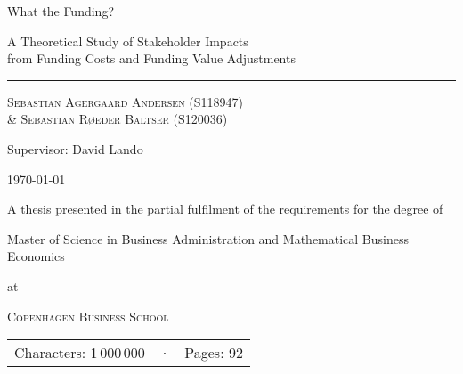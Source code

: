 \documentclass[main.tex]{subfiles}
\begin{document}
	\begin{titlepage}
		\centering
		\vspace{5cm}
		{\Huge What the Funding? \par}
		{\Large A Theoretical Study of Stakeholder Impacts \\ 
		from Funding Costs and Funding Value Adjustments \par}
		\rule{\textwidth}{1px}\par
		{\scshape\large 
			Sebastian Agergaard Andersen {\scriptsize(S118947)} \\
			\& Sebastian Røeder Baltser {\scriptsize(S120036)}
		\par}
		Supervisor: David Lando \\
		
		\vfill
		
		{\Large \today \par}		
		{A thesis presented in the partial fulfilment
		of the requirements for the degree of \\}
		{\Large Master of Science in Business Administration and Mathematical Business Economics \par}
		at \par 
		{\scshape\LARGE Copenhagen Business School\par}
		\vspace{0.5cm}
		\begin{tabular}{>{\raggedleft\arraybackslash}m{5cm}>{\centering\arraybackslash}m{0.75cm}>{\raggedright\arraybackslash}m{5cm}}
		Characters: 1\,000\,000 & · & Pages: 92 \\
		\end{tabular}
		
		\thispagestyle{empty}
	\end{titlepage}
\end{document}
